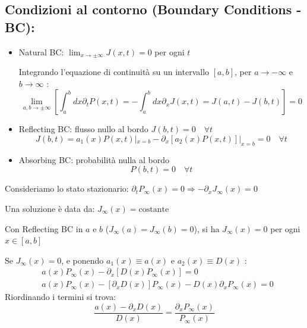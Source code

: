 \subsection{Condizioni al contorno (Boundary Conditions - BC):}

\begin{itemize}
    \item Natural BC: $\lim_{x \rightarrow \pm \infty} J(x,t) = 0$ per ogni $t$
    
    Integrando l'equazione di continuità su un intervallo $[a,b]$, per $a \rightarrow -\infty$ e $b \rightarrow \infty$ :
    \begin{equation}
    \lim_{ a, b \to \pm \infty } \left[ \int_a^b dx \partial_t P(x,t) = -\int_a^b dx \partial_x J(x,t) = J(a,t) - J(b,t) \right] =0
    \end{equation}

\item  Reflecting BC: flusso nullo al bordo  $J(b,t) = 0 \quad \forall t$
    \begin{equation}
    J(b,t) = a_1(x)P(x,t)|_{x=b} - \partial_x [a_2(x)P(x,t)]|_{x=b} = 0 \quad \forall t
    \end{equation}

\item  Absorbing BC: probabilità nulla al bordo
    \begin{equation}
    P(b,t) = 0 \quad \forall t
    \end{equation}
    
\end{itemize}


Consideriamo lo stato stazionario: $\partial_t P_{\infty}(x) = 0 \Rightarrow -\partial_x J_{\infty}(x) = 0$

Una soluzione è data da: $J_{\infty}(x) = \text{costante}$

Con Reflecting BC in $a$ e $b$ ($J_{\infty}(a) = J_{\infty}(b) = 0$), si ha $J_{\infty}(x) = 0$ per ogni $x \in [a,b]$
    
Se $J_{\infty}(x) = 0$, e ponendo $a_1(x) \equiv a(x)$ e $a_2(x) \equiv D(x)$ :
\begin{align}
&a(x)P_{\infty}(x) - \partial_x [D(x)P_{\infty}(x)] = 0 \\ &a(x)P_{\infty}(x) - [ \partial_x D(x) ] P_{\infty}(x) -  D(x) \partial_x P_{\infty}(x) =0
\end{align}
Riordinando i termini si trova:
\begin{equation}
\frac{a(x) - \partial_x D(x)}{D(x)} = \frac{\partial_x P_{\infty}(x)}{P_{\infty}(x)}
\end{equation}

